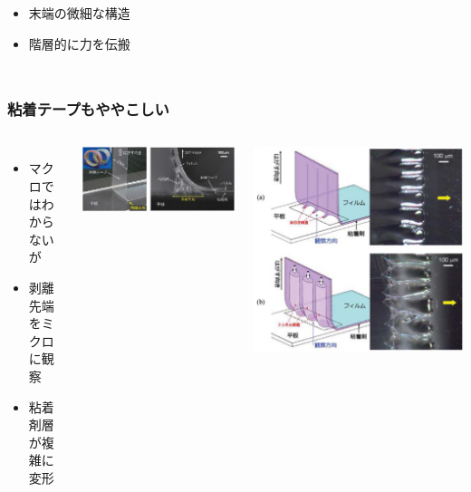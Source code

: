\documentclass[unicode,12pt]{beamer}%
\begin{document}
\begin{frame}
\begin{columns}[T, onlytextwidth]
		\begin{itemize}
			\item 末端の微細な構造
			\item 階層的に力を伝搬
		\end{itemize}
	\end{columns}
\end{frame}

\begin{frame}
	\frametitle{粘着テープもややこしい}
	\begin{columns}[c, onlytextwidth]
		\begin{itemize}
			\item マクロではわからないが
			\item 剥離先端をミクロに観察
			\item 粘着剤層が複雑に変形
		\end{itemize}
		\centering
		\includegraphics[width=\textwidth]{hakuri.png}

		\centering
		\includegraphics[width=.95\textwidth]{hakuri2.png}


\end{columns}
\end{frame}
\end{document}
